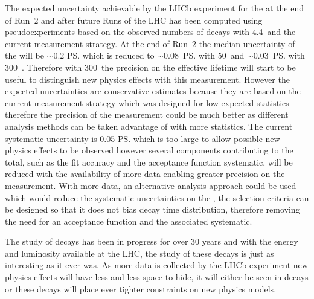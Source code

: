 The expected uncertainty achievable by the LHCb experiment for the \el at the end of Run~2 and after future Runs of the LHC has been computed using pseudoexperiments based on the observed numbers of decays with 4.4~\fb and the current measurement strategy. At the end of Run~2 the median uncertainty of the \el will be $\sim$0.2 \ps which is reduced to $\sim$0.08~\ps with 50~\fb and $\sim$0.03~\ps with 300~\fb. Therefore with 300~\fb the precision on the effective lifetime will start to be useful to distinguish new physics effects with this measurement. However the expected uncertainties are conservative estimates because they are based on the current measurement strategy which was designed for low expected statistics therefore the precision of the measurement could be much better as different analysis methods can be taken advantage of with more statistics. 
The current systematic uncertainty is 0.05 \ps which is too large to allow possible new physics effects to be observed however several components contributing to the total, such as the fit accuracy and the acceptance function systematic, will be reduced with the availability of more data enabling greater precision on the measurement. With more data, an alternative analysis approach could be used which would reduce the systematic uncertainties on the \el, the selection criteria can be designed so that it does not bias \bsmumu decay time distribution, therefore removing the need for an acceptance function and the associated systematic.


The study of \bmumu decays has been in progress for over 30 years and with the energy and luminosity available at the LHC, the study of these decays is just as interesting as it ever was. As more data is collected by the LHCb experiment new physics effects will have less and less space to hide, it will either be seen in \bmumu decays or these decays will place ever tighter constraints on new physics models. 
